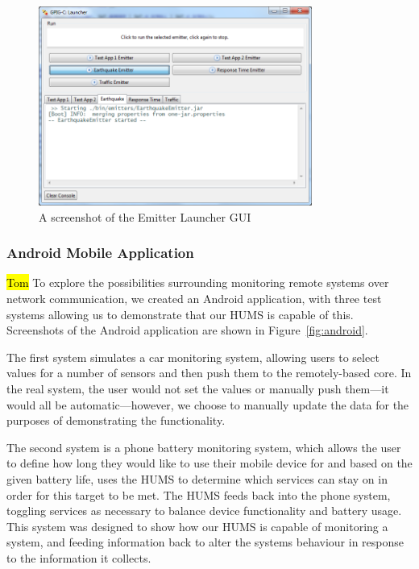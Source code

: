 \documentclass[10pt,a4paper]{article}
\begin{document}
\begin{figure}[tbp]
\centering
\includegraphics*[width=0.8\textwidth]{images/launcherGUI.png}
\caption{A screenshot of the Emitter Launcher GUI}
\label{fig:launcherGUI}
\end{figure}

\subsubsection{Android Mobile Application}
\hl{Tom}
To explore the possibilities surrounding monitoring remote systems over network communication, we created an Android application, with three test systems allowing us to demonstrate that our HUMS is capable of this. Screenshots of the Android application are shown in Figure~\ref{fig:android}.

The first system simulates a car monitoring system, allowing users to select values for a number of sensors and then push them to the remotely-based core. In the real system, the user would not set the values or manually push them---it would all be automatic---however, we choose to manually update the data for the purposes of demonstrating the functionality.

The second system is a phone battery monitoring system, which allows the user to define how long they would like to use their mobile device for and based on the given battery life, uses the HUMS to determine which services can stay on in order for this target to be met. The HUMS feeds back into the phone system, toggling services as necessary to balance device functionality and battery usage. This system was designed to show how our HUMS is capable of monitoring a system, and feeding information back to alter the systems behaviour in response to the information it collects.
\end{document}
